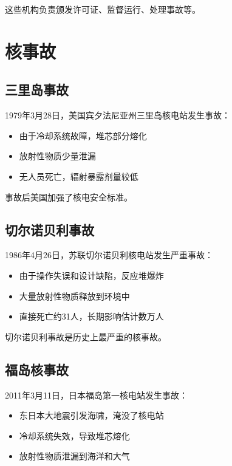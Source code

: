\documentclass[12pt,UTF8]{ctexbook}
\begin{document}
这些机构负责颁发许可证、监督运行、处理事故等。

\chapter{核事故}

\section{三里岛事故}

1979年3月28日，美国宾夕法尼亚州三里岛核电站发生事故：

\begin{itemize}[leftmargin=2cm]
    \item 由于冷却系统故障，堆芯部分熔化
    \item 放射性物质少量泄漏
    \item 无人员死亡，辐射暴露剂量较低
\end{itemize}

事故后美国加强了核电安全标准。

\section{切尔诺贝利事故}

1986年4月26日，苏联切尔诺贝利核电站发生严重事故：

\begin{itemize}[leftmargin=2cm]
    \item 由于操作失误和设计缺陷，反应堆爆炸
    \item 大量放射性物质释放到环境中
    \item 直接死亡约31人，长期影响估计数万人
\end{itemize}

切尔诺贝利事故是历史上最严重的核事故。

\section{福岛核事故}

2011年3月11日，日本福岛第一核电站发生事故：

\begin{itemize}[leftmargin=2cm]
    \item 东日本大地震引发海啸，淹没了核电站
    \item 冷却系统失效，导致堆芯熔化
    \item 放射性物质泄漏到海洋和大气
\end{itemize}
\end{document}
